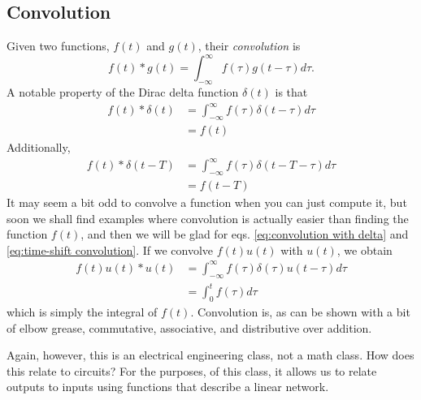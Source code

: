 \documentclass[nobib]{tufte-handout}
\begin{document}
\subsection{Convolution}

Given two functions, $f(t)$ and $g(t)$, their 
\emph{convolution} is 
\[f(t) * g(t) = \int_{-\infty}^{\infty} f(\tau)g(t-\tau)d\tau.\]
A notable property of the Dirac delta function 
$\delta(t)$ is that 
\begin{align} \label{eq:convolution with delta}
    f(t) * \delta(t) &= \int_{-\infty}^{\infty} f(\tau)\delta(t-\tau)d\tau \\
    &= f(t)
\end{align}
Additionally, 
\begin{align} \label{eq:time-shift convolution}
    f(t) * \delta(t - T) &= \int_{-\infty}^{\infty} f(\tau)\delta(t-T-\tau)d\tau \\
    &= f(t - T)
\end{align}
It may seem a bit odd to convolve a function 
when you can just compute it, but soon we shall 
find examples where convolution is actually 
easier than finding the function $f(t)$, and then 
we will be glad for eqs. \ref{eq:convolution with delta}
and \ref{eq:time-shift convolution}.
If we convolve $f(t)u(t)$ with $u(t)$, we obtain 
\begin{align}
    f(t)u(t) * u(t) &= \int_{-\infty}^{\infty} f(\tau)\delta(\tau)u(t-\tau)d\tau \\
    &= \int_{0}^{t} f(\tau) d\tau
\end{align}
which is simply the integral of $f(t)$. 
Convolution is, as can be shown with a bit of elbow 
grease, commutative, associative, and distributive 
over addition. 

Again, however, this is an electrical engineering class, 
not a math class. How does this relate to circuits?
For the purposes, of this class, it allows us 
to relate outputs to inputs using 
functions that describe a linear network. 
\end{document}
